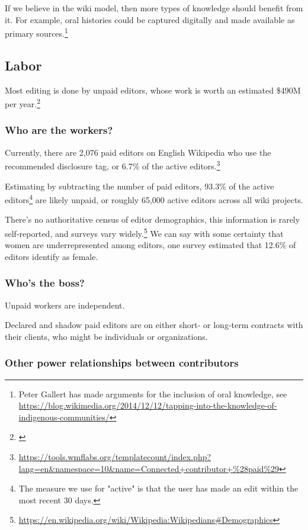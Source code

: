 \documentclass[format=sigconf, authorversion]{acmart}
\begin{document}
If we believe in the wiki model, then more types of knowledge should benefit from it.  For example, oral histories could be captured digitally and made available as primary sources.\footnote{Peter Gallert has made arguments for the inclusion of oral knowledge, see \url{https://blog.wikimedia.org/2014/12/12/tapping-into-the-knowledge-of-indigenous-communities/}}

\subsection{Labor}

Most editing is done by unpaid editors, whose work is worth an estimated \$490M per year.\footnote{\citep{Lund}}

\subsubsection{Who are the workers?}

Currently, there are 2,076 paid editors on English Wikipedia who use the recommended disclosure tag, or 6.7\% of the active editors.\footnote{\url{https://tools.wmflabs.org/templatecount/index.php?lang=en&namespace=10&name=Connected+contributor+\%28paid\%29}}

Estimating by subtracting the number of paid editors, 93.3\% of the active editors\footnote{The measure we use for "active" is that the user has made an edit within the most recent 30 days.} are likely unpaid, or roughly 65,000 active editors across all wiki projects.

There's no authoritative census of editor demographics, this information is rarely self-reported, and surveys vary widely.\footnote{\url{https://en.wikipedia.org/wiki/Wikipedia:Wikipedians\#Demographics}}  We can say with some certainty that women are underrepresented among editors, one survey estimated that 12.6\% of editors identify as female.

\subsubsection{Who's the boss?}

Unpaid workers are independent.

Declared and shadow paid editors are on either short- or long-term contracts with their clients, who might be individuals or organizations.  

\subsubsection{Other power relationships between contributors}
\end{document}
